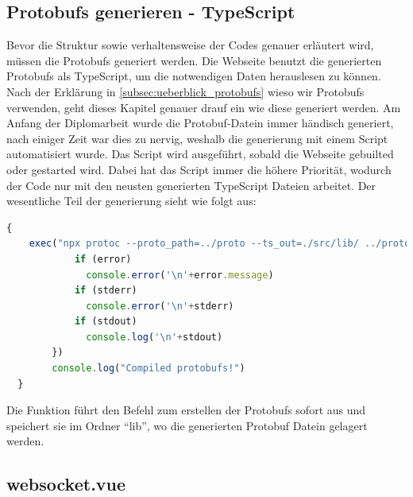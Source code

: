 \subsection{Protobufs generieren - TypeScript}
\label{subsec:proto_gen_TS}
Bevor die Struktur sowie verhaltensweise der Codes genauer erläutert wird,
müssen die Protobufs generiert werden. 
%
Die Webseite benutzt die generierten Protobufs als TypeScript, 
um die notwendigen Daten herauslesen zu können.
%
Nach der Erklärung in \ref{subsec:ueberblick_protobufs} wieso wir Protobufs verwenden,
geht dieses Kapitel genauer drauf ein wie diese generiert werden.
%
Am Anfang der Diplomarbeit wurde die Protobuf-Datein immer händisch generiert, 
nach einiger Zeit war dies zu nervig, weshalb die generierung mit einem Script automatisiert wurde.
%
Das Script wird ausgeführt, sobald die Webseite gebuilted oder gestarted wird.
Dabei hat das Script immer die höhere Priorität, wodurch der Code nur mit den neusten generierten 
TypeScript Dateien arbeitet.
%
Der wesentliche Teil der generierung sieht wie folgt aus:
\begin{lstlisting}[language=JavaScript, gobble=4]
  {
    exec("npx protoc --proto_path=../proto --ts_out=./src/lib/ ../proto/*.proto", (error, stdout, stderr) => {
            if (error)
              console.error('\n'+error.message)
            if (stderr)
              console.error('\n'+stderr)
            if (stdout)
              console.log('\n'+stdout)
        })
        console.log("Compiled protobufs!")
  }
\end{lstlisting}
Die Funktion führt den Befehl zum erstellen der Protobufs sofort aus und speichert sie im Ordner ``lib'',
wo die generierten Protobuf Datein gelagert werden.

\subsection{websocket.vue}
\label{subsec:frontend_websocket.vue}

